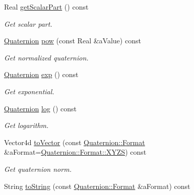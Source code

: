 \begin{DoxyCompactItemize}
Real \hyperlink{classlibrary_1_1math_1_1geom_1_1trf_1_1rot_1_1_quaternion_ac9560aa15c9c4682dd571983bf3f4ab6}{get\+Scalar\+Part} () const
\begin{DoxyCompactList}\small\item\em Get scalar part. \end{DoxyCompactList}\item 
\hyperlink{classlibrary_1_1math_1_1geom_1_1trf_1_1rot_1_1_quaternion}{Quaternion} \hyperlink{classlibrary_1_1math_1_1geom_1_1trf_1_1rot_1_1_quaternion_a1de9e1824ffdbca766d51a984fd2e2ed}{pow} (const Real \&a\+Value) const
\begin{DoxyCompactList}\small\item\em Get normalized quaternion. \end{DoxyCompactList}\item 
\hyperlink{classlibrary_1_1math_1_1geom_1_1trf_1_1rot_1_1_quaternion}{Quaternion} \hyperlink{classlibrary_1_1math_1_1geom_1_1trf_1_1rot_1_1_quaternion_a171373818023a1c013891d4297360542}{exp} () const
\begin{DoxyCompactList}\small\item\em Get exponential. \end{DoxyCompactList}\item 
\hyperlink{classlibrary_1_1math_1_1geom_1_1trf_1_1rot_1_1_quaternion}{Quaternion} \hyperlink{classlibrary_1_1math_1_1geom_1_1trf_1_1rot_1_1_quaternion_a9bcc04be5d0b9128860c9e494abbf5ee}{log} () const
\begin{DoxyCompactList}\small\item\em Get logarithm. \end{DoxyCompactList}\item 
Vector4d \hyperlink{classlibrary_1_1math_1_1geom_1_1trf_1_1rot_1_1_quaternion_a8401dab8c0b8b1b99efbdba1354ba497}{to\+Vector} (const \hyperlink{classlibrary_1_1math_1_1geom_1_1trf_1_1rot_1_1_quaternion_a2ca851b117657819310fe5a9b9e5d681}{Quaternion\+::\+Format} \&a\+Format=\hyperlink{classlibrary_1_1math_1_1geom_1_1trf_1_1rot_1_1_quaternion_a2ca851b117657819310fe5a9b9e5d681a11c51ecd5dc6f86ba3c1ae79e21482f5}{Quaternion\+::\+Format\+::\+X\+Y\+ZS}) const
\begin{DoxyCompactList}\small\item\em Get quaternion norm. \end{DoxyCompactList}\item 
String \hyperlink{classlibrary_1_1math_1_1geom_1_1trf_1_1rot_1_1_quaternion_adb8b06d466e8235dd5ff4ded9331a85f}{to\+String} (const \hyperlink{classlibrary_1_1math_1_1geom_1_1trf_1_1rot_1_1_quaternion_a2ca851b117657819310fe5a9b9e5d681}{Quaternion\+::\+Format} \&a\+Format) const

\end{DoxyCompactItemize}
